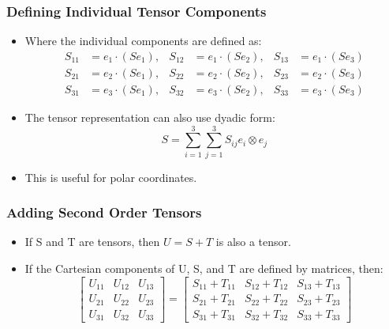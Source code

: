 \documentclass{beamer}
\begin{document}
\begin{frame}
\frametitle{Defining Individual Tensor Components}
\begin{itemize}
    \item Where the individual components are defined as: 
    \begin{align*}
        S_{11} &= e_1 \cdot (S e_1), & S_{12} &= e_1 \cdot (S e_2), & S_{13} &= e_1 \cdot (S e_3) \\
        S_{21} &= e_2 \cdot (S e_1), & S_{22} &= e_2 \cdot (S e_2), & S_{23} &= e_2 \cdot (S e_3) \\
        S_{31} &= e_3 \cdot (S e_1), & S_{32} &= e_3 \cdot (S e_2), & S_{33} &= e_3 \cdot (S e_3)
    \end{align*}
    \item The tensor representation can also use dyadic form:
    \[
    S = \sum_{i=1}^{3} \sum_{j=1}^{3} S_{ij} e_i \otimes e_j
    \]
    \item This is useful for polar coordinates.
\end{itemize}
\end{frame}

\begin{frame}
\frametitle{Adding Second Order Tensors}
\begin{itemize}
    \item If S and T are tensors, then \(U = S + T\) is also a tensor. 
    \item If the Cartesian components of U, S, and T are defined by matrices, then: 
    \[
    \begin{bmatrix}
        U_{11} & U_{12} & U_{13} \\
        U_{21} & U_{22} & U_{23} \\
        U_{31} & U_{32} & U_{33}
    \end{bmatrix} =
    \begin{bmatrix}
        S_{11} + T_{11} & S_{12} + T_{12} & S_{13} + T_{13} \\
        S_{21} + T_{21} & S_{22} + T_{22} & S_{23} + T_{23} \\
        S_{31} + T_{31} & S_{32} + T_{32} & S_{33} + T_{33}
    \end{bmatrix}
    \]
\end{itemize}
\end{frame}
\end{document}
